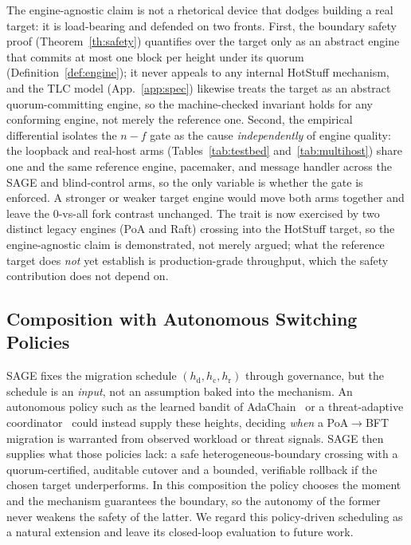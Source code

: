 \documentclass[journal]{IEEEtran}
\theoremstyle{definition}
\theoremstyle{remark}
\begin{document}
The engine-agnostic claim is not a rhetorical device that dodges building a real target: it is
load-bearing and defended on two fronts. First, the boundary safety proof
(Theorem~\ref{th:safety}) quantifies over the target only as an abstract engine that commits at
most one block per height under its quorum (Definition~\ref{def:engine}); it never appeals to any
internal HotStuff mechanism, and the TLC model (App.~\ref{app:spec}) likewise treats the target as
an abstract quorum-committing engine, so the machine-checked invariant holds for any conforming
engine, not merely the reference one. Second, the empirical differential isolates the $n{-}f$ gate
as the cause \emph{independently} of engine quality: the loopback and real-host arms
(Tables~\ref{tab:testbed} and~\ref{tab:multihost}) share one and the same reference engine,
pacemaker, and message handler across the SAGE and blind-control arms, so the only variable is
whether the gate is enforced. A stronger or weaker target engine would move both arms together and
leave the $0$-vs-all fork contrast unchanged. The trait is now exercised by two distinct legacy
engines (PoA and Raft) crossing into the HotStuff target, so the engine-agnostic claim is
demonstrated, not merely argued; what the reference target does \emph{not} yet establish is
production-grade throughput, which the safety contribution does not depend on.

\subsection{Composition with Autonomous Switching Policies}
SAGE fixes the migration schedule $(h_{\mathrm{d}}, h_{\mathrm{c}}, h_{\mathrm{r}})$ through governance,
but the schedule is an \emph{input}, not an assumption baked into the mechanism. An autonomous policy
such as the learned bandit of AdaChain~\cite{adachain} or a threat-adaptive
coordinator~\cite{threatadapt,adacon} could instead supply these heights, deciding \emph{when} a
PoA$\rightarrow$BFT migration is warranted from observed workload or threat signals. SAGE then supplies
what those policies lack: a safe heterogeneous-boundary crossing with a quorum-certified, auditable
cutover and a bounded, verifiable rollback if the chosen target underperforms. In this composition the
policy chooses the moment and the mechanism guarantees the boundary, so the autonomy of the former never
weakens the safety of the latter. We regard this policy-driven scheduling as a natural extension and
leave its closed-loop evaluation to future work.
\end{document}
